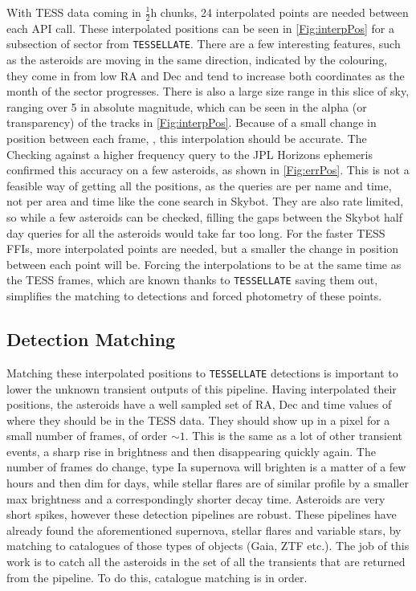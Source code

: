 \documentclass{UCreport}
\begin{document}
With TESS data coming in $\frac12\unit{\hour}$ chunks, 24 interpolated points are needed between each API call.
These interpolated positions can be seen in \autoref{Fig:interpPos} for a subsection of sector from \texttt{TESSELLATE}.
There are a few interesting features, such as the asteroids are moving in the same direction, indicated by the colouring, they come in from low RA and Dec and tend to increase both coordinates as the month of the sector progresses.
There is also a large size range in this slice of sky, ranging over \qty{5}{\mag} in absolute magnitude, which can be seen in the alpha (or transparency) of the tracks in \autoref{Fig:interpPos}.
Because of a small change in position between each frame, \citep[$\sim \qty{1}{\px}$ per frame][]{Pal2018}, this interpolation should be accurate.
The
Checking against a higher frequency query to the JPL Horizons ephemeris  confirmed this accuracy on a few asteroids, as shown in \autoref{Fig:errPos}.
This is not a feasible way of getting all the positions, as the queries are per name and time, not per area and time like the cone search in Skybot.
They are also rate limited, so while a few asteroids can be checked, filling the gaps between the Skybot half day queries for all the asteroids would take far too long.
For the faster TESS FFIs, more interpolated points are needed, but a smaller the change in position between each point will be.
Forcing the interpolations to be at the same time as the TESS frames, which are known thanks to \texttt{TESSELLATE} saving them out, simplifies the matching to detections and forced photometry of these points.


\subsection{Detection Matching}\label{SubSec:Match}

Matching these interpolated positions to \texttt{TESSELLATE} detections is important to lower the unknown transient outputs of this pipeline.
Having interpolated their positions, the asteroids have a well sampled set of RA, Dec and time values of where they should be in the TESS data.
They should show up in a pixel for a small number of frames, of order $\sim1$.
This is the same as a lot of other transient events, a sharp rise in brightness and then disappearing quickly again.
The number of frames do change, type Ia supernova will brighten is a matter of a few hours and then dim for days, while stellar flares are of similar profile by a smaller max brightness and a correspondingly shorter decay time.
Asteroids are very short spikes, however these detection pipelines are robust. %
These pipelines have already found the aforementioned supernova, stellar flares and variable stars, by matching to catalogues of those types of objects (Gaia, ZTF etc.).
The job of this work is to catch all the asteroids in the set of all the transients that are returned from the pipeline.
To do this, catalogue matching is in order.
\end{document}
